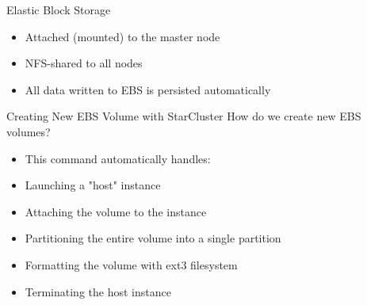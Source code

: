 \begin{frame}{Elastic Block Storage}
    \begin{itemize}
        \item Attached (mounted) to the master node 
	\item NFS-shared to all nodes
        \item All data written to EBS is persisted automatically
    \end{itemize}
\end{frame}

\begin{nologo}
\begin{frame}{Creating New EBS Volume with StarCluster}
    How do we create new EBS volumes?
    
    \begin{itemize}
        \item This command automatically handles:
	\item Launching a "host" instance
	\item Attaching the volume to the instance
	\item Partitioning the entire volume into a single partition
	\item Formatting the volume with ext3 filesystem
        \item Terminating the host instance
    \end{itemize}
\end{frame}
\end{nologo}
